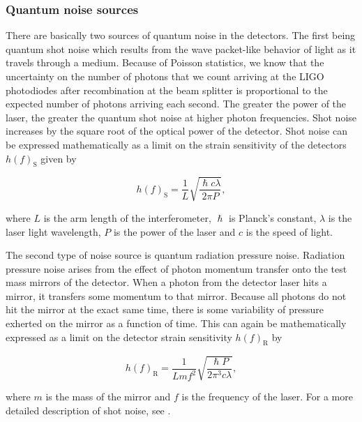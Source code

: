 \subsubsection{Quantum noise sources}

%
%
There are basically two sources of quantum noise
in the detectors. The first being quantum shot noise 
which results from the wave packet-like 
behavior of light as it travels through a medium. 
Because of Poisson statistics, we know that the 
uncertainty on the number of photons that we 
count arriving at the \ac{LIGO} photodiodes 
after recombination at the beam splitter is 
proportional to the expected number of photons 
arriving each second. The greater the power 
of the laser, the greater the quantum shot 
noise at higher photon frequencies. Shot noise increases 
by the square root of the optical power of the detector. 
Shot noise can be expressed mathematically as a limit 
on the strain sensitivity of the detectors $h(f)_{\mathrm{S}}$ given 
by 

\begin{equation}
    h(f)_{\mathrm{S}} = \frac{1}{L} \sqrt{\frac{\hslash c \lambda}{2\pi P}},
\end{equation}

where $L$ is the arm length of the interferometer, $\hslash$ is 
Planck's constant, $\lambda$ is the laser light wavelength, 
$P$ is the power of the laser and $c$ is the speed of light.

%
%

The second type of noise source is quantum 
radiation pressure noise. Radiation pressure noise 
arises from the effect of photon momentum transfer 
onto the test mass mirrors of the detector. When 
a photon from the detector laser hits a mirror, it 
transfers some momentum to that mirror. Because all photons 
do not hit the mirror at the exact same time, there is 
some variability of pressure exherted on the mirror as 
a function of time. This can again be mathematically expressed 
as a limit on the detector strain sensitivity $h(f)_{\mathrm{R}}$ by 

\begin{equation}
    h(f)_{\mathrm{R}} = \frac{1}{Lmf^2}  \sqrt{\frac{\hslash P}{2\pi^3 c\lambda}},
\end{equation}

where $m$ is the mass of the mirror and $f$ is the frequency of the laser. 
For a more detailed description of shot noise, see \cite{Hild2014}.

